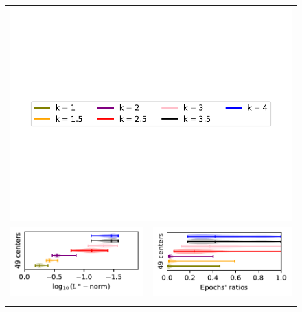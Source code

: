 \documentclass[12pt]{report} %
\begin{document}
\begin{figure}[h]
  \begin{tabular}{rl}
    \multicolumn{2}{c}{{\includegraphics[width=.7\textwidth, trim={0.5cm 4cm .5cm 3.8cm},clip=true]
          {imagenes/experiments/1d/statistical_1d_full/runge_function/runge_function_legend.pdf}}} \\ 
    {\includegraphics[width=.5\textwidth, trim={0 1.25cm 0 0},clip=true]
    {imagenes/experiments/2d/sin_pi_x_y_sq_interpolation/linf_sin_pi_x_y_sq_C7_gaussian_kernel.pdf}}  & 
    {\includegraphics[width=.44\textwidth, trim={.7cm 1.15cm 0 0},clip=true]
    {imagenes/experiments/2d/sin_pi_x_y_sq_interpolation/epochs_sin_pi_x_y_sq_C7_gaussian_kernel.pdf}}                                                                                      \\
    {\includegraphics[width=.5\textwidth, trim={0 1.25cm 0 0},clip=true]
}
\end{tabular}
\end{figure}
\end{document}
